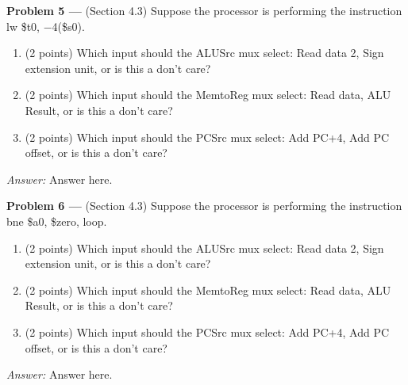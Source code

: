 \documentclass[11pt]{article}
\newcommand{\problem}[1]{\textbf{Problem #1 ---} }
\newcommand{\answer}{{\color{red}\textit{Answer: }}}
\begin{document}
\problem{5}(Section 4.3) Suppose the processor is performing the instruction \textsf{lw \$t0, $-$4(\$s0)}.
\begin{enumerate}
    \item(2 points) Which input should the \textsf{ALUSrc} mux select: Read data 2, Sign extension unit, or is this a don't care?
    \item(2 points) Which input should the \textsf{MemtoReg} mux select:  Read data, ALU Result, or is this a don't care?
    \item(2 points) Which input should the \textsf{PCSrc} mux select: Add PC+4, Add PC offset, or is this a don't care?
\end{enumerate}

\answer
Answer here.

\problem{6}(Section 4.3) Suppose the processor is performing the instruction \textsf{bne \$a0, \$zero, loop}.
\begin{enumerate}
    \item(2 points) Which input should the \textsf{ALUSrc} mux select: Read data 2, Sign extension unit, or is this a don't care?
    \item(2 points) Which input should the \textsf{MemtoReg} mux select:  Read data, ALU Result, or is this a don't care?
    \item(2 points) Which input should the \textsf{PCSrc} mux select: Add PC+4, Add PC offset, or is this a don't care?
\end{enumerate}

\answer
Answer here.
\end{document}
